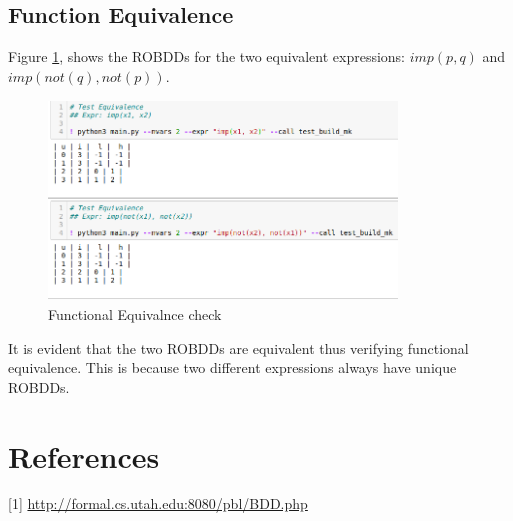 \documentclass[a4paper, titlepage, 12pt]{article}
\numberwithin{equation}{section}
\begin{document}
        \subsection{Function Equivalence}

            Figure \ref{fig:eq_check}, shows the ROBDDs for the two equivalent expressions: $imp(p, q)$ and $imp(not(q), not(p))$.

            \begin{figure}[htp]
                \centering
                \includegraphics[height=200px, width=350px]{img/eq_check.png}
                \caption{Functional Equivalnce check}
                \label{fig:eq_check}
            \end{figure}

            It is evident that the two ROBDDs are equivalent thus verifying functional equivalence.
            This is because two different expressions always have unique ROBDDs.
            

                        
            
    \section{References}

            [1]  \href{http://formal.cs.utah.edu:8080/pbl/BDD.php}{http://formal.cs.utah.edu:8080/pbl/BDD.php}
\end{document}
